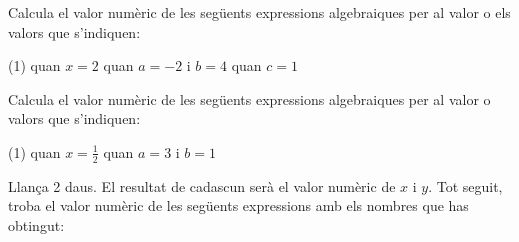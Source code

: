 \begin{mylist}
\answers{[$0$, $-1$, $-2$]}

\exer  Calcula el valor numèric de les següents expressions algebraiques per al valor o els valors que s'indiquen:
\begin{tasks}(1)
	\task  {}   quan   $ x = 2$   
	\task {}   quan    $a = -2$ i $\textit{b} = 4$   
	\task  {}   quan    $c = 1$
\end{tasks}

\answers{[$1$, $-1$, $11$]}

\exer  Calcula el valor numèric de les següents expressions algebraiques per al valor o valors que s'indiquen:
\begin{tasks}(1)
	\task  {}  quan  $x=\frac{1}{2}$   
	\task {}  quan $a=3 $ i $b=1$
\end{tasks}

\answers{[$\frac{9}{4}$, $9$]}

\vspace{-3.75cm}
\exer \begin{minipage}[t]{0.75\textwidth}
	\simbolsearch Llança 2 daus. El resultat de cadascun serà el valor numèric de $x$ i $y$. Tot seguit, troba el valor numèric de les següents expressions amb els nombres que has obtingut: \vspace{0.25cm}
	

\end{minipage}
\end{mylist}
